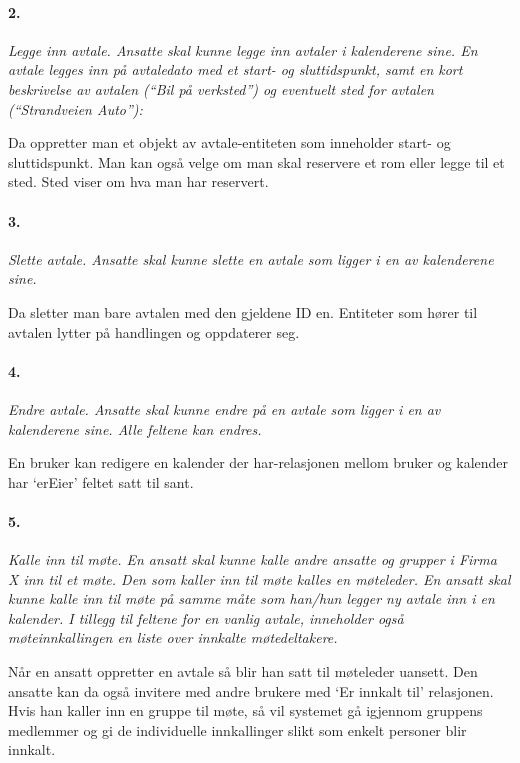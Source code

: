 \documentclass[titlepage]{article}
\begin{document}
\paragraph{2.}\textit{ Legge inn avtale. Ansatte skal kunne legge inn avtaler i kalenderene sine. En avtale
legges inn på avtaledato med et start- og sluttidspunkt, samt en kort beskrivelse av
avtalen (``Bil på verksted'') og eventuelt sted for avtalen (``Strandveien Auto''):}

Da oppretter man et objekt av avtale-entiteten som inneholder start- og sluttidspunkt. Man kan også velge om man skal reservere et rom eller legge til et sted. Sted viser om hva man har reservert.

\paragraph{3.}\textit{ Slette avtale. Ansatte skal kunne slette en avtale som ligger i en av kalenderene sine.}

Da sletter man bare avtalen med den gjeldene ID en. Entiteter som hører til avtalen lytter på handlingen og oppdaterer seg.

\paragraph{4.}\textit{ Endre avtale. Ansatte skal kunne endre på en avtale som ligger i en av kalenderene sine. Alle feltene kan endres.}

En bruker kan redigere en kalender der har-relasjonen mellom bruker og kalender har ‘erEier’ feltet satt til sant. 

\paragraph{5.}\textit{ Kalle inn til møte. En ansatt skal kunne kalle andre ansatte og grupper i Firma X inn til et møte. Den som kaller inn til møte kalles en møteleder. En ansatt skal kunne kalle inn til møte på samme måte som han/hun legger ny avtale inn i en kalender. I tillegg til
feltene for en vanlig avtale, inneholder også møteinnkallingen en liste over innkalte
møtedeltakere.}

Når en ansatt oppretter en avtale så blir han satt til møteleder uansett. Den ansatte kan da også invitere med andre brukere med ‘Er innkalt til’ relasjonen. Hvis han kaller inn en gruppe til møte, så vil systemet gå igjennom gruppens medlemmer og gi de individuelle innkallinger slikt som enkelt personer blir innkalt. 
\end{document}

